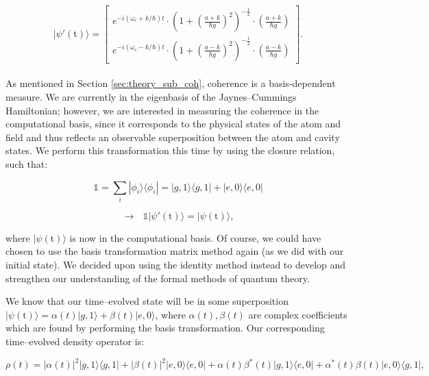 \documentclass[11pt]{article}
\begin{document}
\begin{equation*}
    |\psi'(\text{t})\rangle = 
    \begin{bmatrix}
        e^{-i(\omega_c + k/\hbar)t}\cdot\left(1 + \left(\frac{a + k}{\hbar g}\right)^2\right)^{-\frac{1}{2}}\cdot\left(\frac{a + k}{\hbar g}\right) \\
        e^{-i(\omega_c - k/\hbar)t}\cdot\left(1 + \left(\frac{a - k}{\hbar g}\right)^2\right)^{-\frac{1}{2}}\cdot\left(\frac{a - k}{\hbar g}\right)
    \end{bmatrix}.
\end{equation*}
\\
As mentioned in Section \ref{sec:theory_sub_coh}, coherence is a basis-dependent measure. We are currently in the eigenbasis of the Jaynes--Cummings Hamiltonian; however, we are interested in measuring the coherence in the computational basis, since it corresponds to the physical states of the atom and field and thus reflects an observable superposition between the atom and cavity states. We perform this transformation this time by using the closure relation, such that:

\begin{equation*}
    \mathds{1} = \sum_i|\phi_i\rangle\langle\phi_i| = |g,1\rangle\langle g,1| + |e,0\rangle\langle e,0|
\end{equation*}

\begin{equation*}
    \rightarrow \text{  } \mathds{1}|\psi'(\text{t})\rangle = |\psi(\text{t})\rangle,
\end{equation*}


where $|\psi(\text{t})\rangle$ is now in the computational basis. Of course, we could have chosen to use the basis transformation matrix method again (as we did with our initial state). We decided upon using the identity method instead to develop and strengthen our understanding of the formal methods of quantum theory. 

We know that our time--evolved state will be in some superposition $|\psi(\text{t})\rangle = \alpha(t)|g,1\rangle + \beta(t)|e,0\rangle$, where $\alpha(t),\beta(t)$ are complex coefficients which are found by performing the basis transformation. Our corresponding time--evolved density operator is:

\begin{equation} \label{eqn:JCM_dm(t)_closed}
    \rho(t) = |\alpha(t)|^2|g,1\rangle\langle g,1| + |\beta(t)|^2 |e,0\rangle\langle e,0| + \alpha(t)\beta^*(t)|g,1\rangle\langle e,0| + \alpha^*(t)\beta(t)|e,0\rangle\langle g,1|,
\end{equation}
\end{document}
